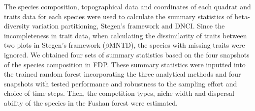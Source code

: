 	The species composition, topographical data and coordinates of each quadrat and traits data for each species were used to calculate the summary statistics of beta-diversity variation partitioning, Stegen's framework and DNCI. Since the incompleteness in trait data, when calculating the dissimilarity of traits between two plots in Stegen's framework ($\beta$MNTD), the species with missing traits were ignored. We obtained four sets of summary statistics based on the four snapshots of the species composition in FDP. These summary statistics were inputted into the trained random forest incorporating the three analytical methods and four snapshots with tested performance and robustness to the sampling effort and choice of time steps. Then, the competition types, niche width and dispersal ability of the species in the Fushan forest were estimated.
	